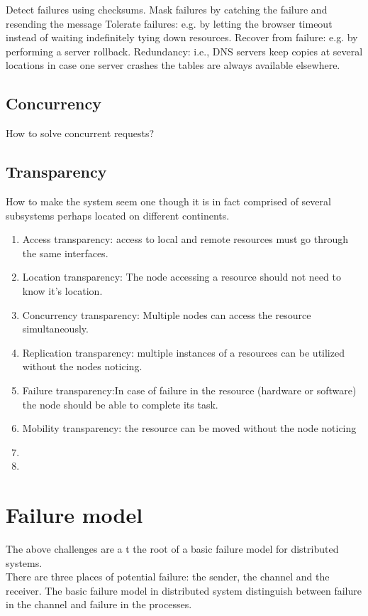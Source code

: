 Detect failures using checksums.
Mask failures by catching the failure and resending the message 
Tolerate failures:  e.g. by letting the browser timeout instead of waiting indefinitely tying down resources. 
Recover from failure: e.g. by performing a server rollback.
Redundancy: i.e., DNS servers keep copies at several locations in case one server crashes the tables are always available elsewhere. 

\subsection{Concurrency}
How to solve concurrent requests? 

\subsection{Transparency}

How to make the system seem one though it is in fact comprised of several subsystems perhaps located on different continents.

\begin{enumerate}
\item Access transparency: access to local and remote resources must go through the same  interfaces.
\item Location transparency: The node accessing a resource should not need to know it’s location.
\item Concurrency transparency: Multiple nodes can access the resource simultaneously. 
\item Replication transparency: multiple instances of a resources can be utilized without the nodes noticing.
\item Failure transparency:In case of failure in the resource (hardware or software) the node should be able to complete its task.
\item Mobility transparency: the resource can be moved without the node noticing
\item 
\item 
\end{enumerate}


\section{Failure model}

The above challenges are a t the root of a basic failure model for distributed systems. \\

There are three places of potential failure: the sender, the channel and the receiver. 
The basic failure model in distributed system distinguish between failure in the channel and failure in the processes.

